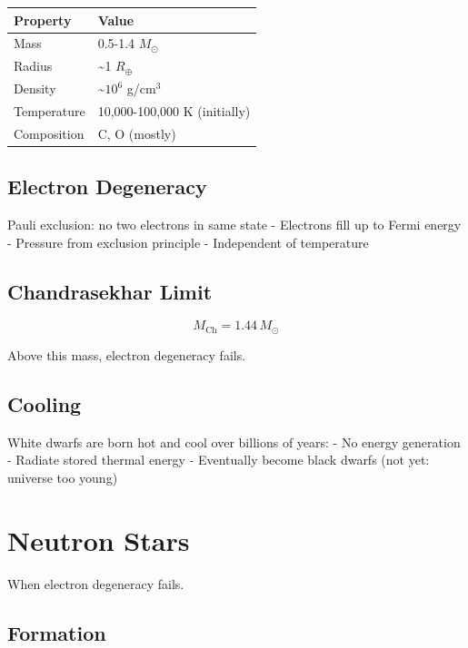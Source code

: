 \documentclass[
  11pt,
  letterpaper,
  twoside,
  openright]{book}
\begin{document}
\begin{longtable}[]{@{}ll@{}}
\toprule\noalign{}
Property & Value \\
\midrule\noalign{}
\endhead
\bottomrule\noalign{}
\endlastfoot
Mass & 0.5-1.4 \(M_\odot\) \\
Radius & \textasciitilde1 \(R_\oplus\) \\
Density & \textasciitilde{}\(10^6\) g/cm\(^3\) \\
Temperature & 10,000-100,000 K (initially) \\
Composition & C, O (mostly) \\
\end{longtable}

\subsection{Electron Degeneracy}\label{electron-degeneracy-1}

Pauli exclusion: no two electrons in same state - Electrons fill up to
Fermi energy - Pressure from exclusion principle - Independent of
temperature

\subsection{Chandrasekhar Limit}\label{chandrasekhar-limit}

\[
M_{\text{Ch}} = 1.44 \, M_\odot
\]

Above this mass, electron degeneracy fails.

\subsection{Cooling}\label{cooling}

White dwarfs are born hot and cool over billions of years: - No energy
generation - Radiate stored thermal energy - Eventually become black
dwarfs (not yet: universe too young)

\section{Neutron Stars}\label{neutron-stars}

When electron degeneracy fails.

\subsection{Formation}\label{formation-2}
\end{document}
